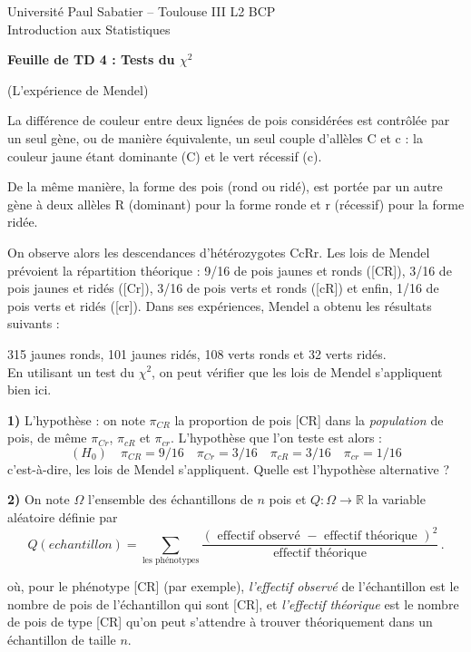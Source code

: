 \documentclass{article}
\numberwithin{equation}{section}
\begin{document}
\noindent Université Paul Sabatier -- Toulouse III
\hfill L2 BCP \\
\noindent Introduction aux Statistiques

\bigskip
\bigskip


\begin{center}
{\bf \large Feuille de TD 4 : Tests du $\chi^2$}
\end{center}

\bigskip
\bigskip

(L'expérience de Mendel) 

La différence de couleur entre deux lignées de pois considérées est contrôlée par un seul gène, ou de manière 
équivalente, un seul couple d'allèles C et c : la couleur jaune étant dominante (C) et le vert récessif (c).

De la même manière, la forme des pois (rond ou ridé), est portée par un autre gène à deux allèles R (dominant) pour la 
forme ronde et r (récessif) pour la forme ridée. 

On observe alors les descendances d'hétérozygotes CcRr. Les lois de Mendel prévoient la répartition théorique :
9/16 de pois jaunes et ronds ([CR]), 3/16 de pois jaunes et ridés ([Cr]), 3/16 de pois verts et ronds ([cR]) et enfin, 
1/16 de pois verts et ridés ([cr]).
Dans ses expériences, Mendel a obtenu les résultats suivants :

315 jaunes ronds, 101 jaunes ridés, 108 verts ronds et 32 verts ridés.\\
\noindent  En utilisant un test du $\chi^2$, on peut vérifier que les lois de Mendel s'appliquent bien ici. 

{\bf 1)} L'hypothèse : on note $\pi_{CR}$ la proportion de pois [CR] dans la {\it population} de pois, de même $\pi_{Cr}$,
$\pi_{cR}$ et $\pi_{cr}$. L'hypothèse que l'on teste est alors :
$$
(H_0)\quad \pi_{CR}=9/16\quad \pi_{Cr}=3/16\quad  \pi_{cR}=3/16\quad  \pi_{cr}=1/16
$$
c'est-à-dire, les lois de Mendel s'appliquent. Quelle est l'hypothèse alternative ?

{\bf 2)} On note $\Omega$ l'ensemble des échantillons de $n$ pois et $Q : \Omega \longrightarrow \mathbb{R}$ la variable aléatoire définie par
$$
Q(echantillon)=\sum_{{\mbox {les phénotypes}}} \frac{ ({\mbox { effectif observé }} -  {\mbox { effectif théorique }})^2}
 { {\mbox { effectif théorique }}} \,.
$$

où, pour le phénotype [CR] (par exemple), {\it l'effectif observé} de l'échantillon est le nombre de pois de l'échantillon qui sont
 [CR],  et  {\it l'effectif théorique} est le nombre de pois de type [CR] qu'on peut s'attendre \`a trouver théoriquement 
dans un échantillon de taille $n$.
\end{document}
